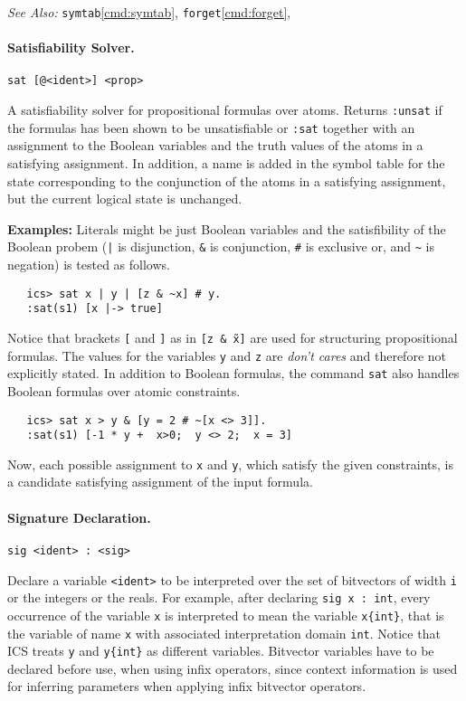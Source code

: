 \documentclass[12pt]{article}
\begin{document}
\noindent
{\em See Also:}  
\texttt{symtab}\ref{cmd:symtab}, 
\texttt{forget}\ref{cmd:forget},


\paragraph{Satisfiability Solver.}\label{cmd:sat}
  \begin{center}
  \texttt{sat [@<ident>] <prop>}
  \end{center}
A satisfiability solver for propositional formulas over atoms. Returns
\texttt{:unsat} if the formulas has been shown to be unsatisfiable or
\texttt{:sat} together with an assignment to the Boolean variables and the
truth values of the atoms in a satisfying assignment.  In addition, a name
is added in the symbol table for the state corresponding to the conjunction of 
the atoms in a satisfying assignment, but the current logical state is unchanged.

{\bf Examples:} Literals might be just Boolean variables and the
satisfibility of the Boolean probem (\texttt{|} is disjunction, \texttt{\&}
is conjunction, \texttt{\#} is exclusive or, and \texttt{\~} is negation) is
tested as follows.
  \begin{verbatim}
   ics> sat x | y | [z & ~x] # y.
   :sat(s1) [x |-> true]
   \end{verbatim}
Notice that brackets \texttt{[} and \texttt{]} as in \texttt{[z \& \~x]} are used
for structuring propositional formulas. The values for the variables \texttt{y} and
\texttt{z} are {\em don't cares} and therefore not explicitly stated.
In addition to Boolean formulas, the command \texttt{sat} also handles Boolean formulas
over atomic constraints.
   \begin{verbatim}
   ics> sat x > y & [y = 2 # ~[x <> 3]].
   :sat(s1) [-1 * y +  x>0;  y <> 2;  x = 3]
   \end{verbatim}
Now, each possible assignment to \texttt{x} and \texttt{y}, which satisfy the given
constraints, is a candidate satisfying assignment of the input formula.


\paragraph{Signature Declaration.}\label{cmd:sig}
  \begin{center}
  \texttt{sig <ident> : <sig>}
  \end{center}
Declare a variable \texttt{<ident>} to be interpreted over the 
set of bitvectors of width \texttt{i} or the integers or the reals.
For example, after declaring \texttt{sig x : int}, every occurrence
of the variable \texttt{x} is interpreted to mean the variable 
\texttt{x\{int\}}, that is the variable of name \texttt{x} with
associated interpretation domain \texttt{int}\@.  Notice that ICS
treats \texttt{y} and \texttt{y\{int\}} as different variables.
Bitvector variables have to be declared before use, when using infix
operators, since context information is used for inferring parameters 
when applying infix bitvector operators.
\end{document}
